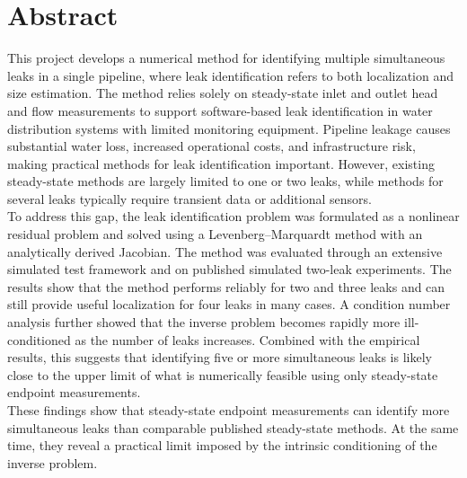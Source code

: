\chapter*{Abstract}

This project develops a numerical method for identifying multiple simultaneous leaks in a single pipeline, where leak identification refers to both localization and size estimation. The method relies solely on steady-state inlet and outlet head and flow measurements to support software-based leak identification in water distribution systems with limited monitoring equipment. Pipeline leakage causes substantial water loss, increased operational costs, and infrastructure risk, making practical methods for leak identification important. However, existing steady-state methods are largely limited to one or two leaks, while methods for several leaks typically require transient data or additional sensors.\\

To address this gap, the leak identification problem was formulated as a nonlinear residual problem and solved using a Levenberg--Marquardt method with an analytically derived Jacobian. The method was evaluated through an extensive simulated test framework and on published simulated two-leak experiments. The results show that the method performs reliably for two and three leaks and can still provide useful localization for four leaks in many cases. A condition number analysis further showed that the inverse problem becomes rapidly more ill-conditioned as the number of leaks increases. Combined with the empirical results, this suggests that identifying five or more simultaneous leaks is likely close to the upper limit of what is numerically feasible using only steady-state endpoint measurements.\\

These findings show that steady-state endpoint measurements can identify more simultaneous leaks than comparable published steady-state methods. At the same time, they reveal a practical limit imposed by the intrinsic conditioning of the inverse problem.